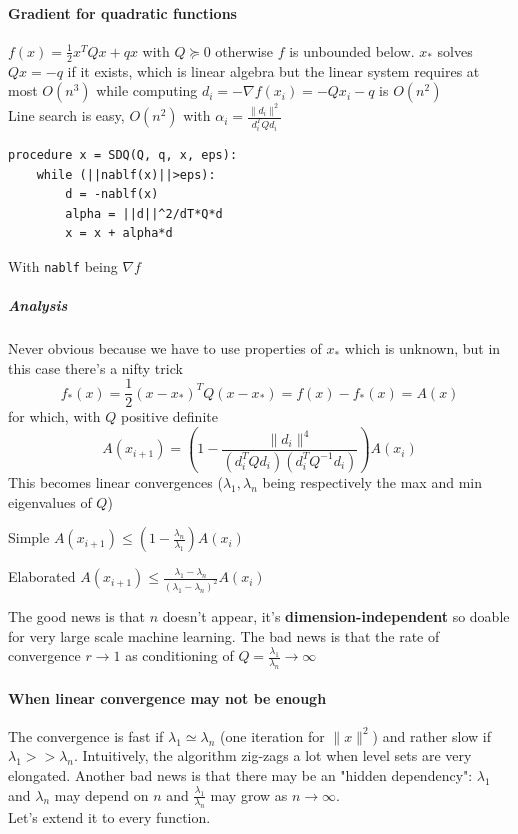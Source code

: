 \documentclass[10pt]{report}
\begin{document}
\paragraph{Gradient for quadratic functions} $f(x) = \frac{1}{2}x^TQx + qx$ with $Q\succeq 0$ otherwise $f$ is unbounded below. $x_*$ solves $Qx = -q$ if it exists, which is linear algebra but the linear system requires at most $O(n^3)$ while computing $d_i = -\nabla f(x_i) = -Qx_i - q$ is $O(n^2)$\\
Line search is easy, $O(n^2)$ with $\alpha_i = \frac{\|d_i\|^2}{d_i^TQd_i}$
\begin{lstlisting}[style=myPython]
procedure x = SDQ(Q, q, x, eps):
	while (||nablf(x)||>eps):
		d = -nablf(x)
		alpha = ||d||^2/dT*Q*d
		x = x + alpha*d
\end{lstlisting}
With \texttt{nablf} being $\nabla f$
\subparagraph{Analysis} Never obvious because we have to use properties of $x_*$ which is unknown, but in this case there's a nifty trick
$$f_*(x) = \frac{1}{2}(x-x_*)^TQ(x-x_*) = f(x) - f_*(x) = A(x)$$
for which, with $Q$ positive definite $$A(x_{i+1}) = \left(1-\frac{\|d_i\|^4}{(d_i^TQd_i)(d_i^TQ^{-1}d_i)} \right)A(x_i)$$
This becomes linear convergences ($\lambda_1,\lambda_{n}$ being respectively the max and min eigenvalues of $Q$)
\begin{list}{}{}
	\item Simple $A(x_{i+1}) \leq (1-\frac{\lambda_n}{\lambda_1})A(x_i)$
	\item Elaborated $A(x_{i+1}) \leq \frac{\lambda_1 - \lambda_n}{(\lambda_1 - \lambda_n)^2}A(x_i)$
\end{list}
The good news is that $n$ doesn't appear, it's \textbf{dimension-independent} so doable for very large scale machine learning. The bad news is that the rate of convergence $r\rightarrow 1$ as conditioning of $Q = \frac{\lambda_1}{\lambda_n}\rightarrow\infty$
\paragraph{When linear convergence may not be enough} The convergence is fast if $\lambda_1\simeq \lambda_n$ (one iteration for $\|x\|^2$) and rather slow if $\lambda_1 >> \lambda_n$. Intuitively, the algorithm zig-zags a lot when level sets are very elongated. Another bad news is that there may be an "hidden dependency": $\lambda_1$ and $\lambda_n$ may depend on $n$ and $\frac{\lambda_1}{\lambda_n}$ may grow as $n\rightarrow\infty$.\\
Let's extend it to every function.
\end{document}
